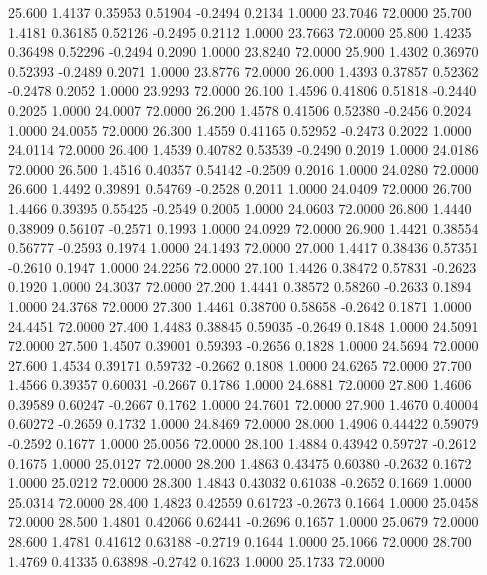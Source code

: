   25.600   1.4137   0.35953   0.51904  -0.2494   0.2134   1.0000  23.7046  72.0000
  25.700   1.4181   0.36185   0.52126  -0.2495   0.2112   1.0000  23.7663  72.0000
  25.800   1.4235   0.36498   0.52296  -0.2494   0.2090   1.0000  23.8240  72.0000
  25.900   1.4302   0.36970   0.52393  -0.2489   0.2071   1.0000  23.8776  72.0000
  26.000   1.4393   0.37857   0.52362  -0.2478   0.2052   1.0000  23.9293  72.0000
  26.100   1.4596   0.41806   0.51818  -0.2440   0.2025   1.0000  24.0007  72.0000
  26.200   1.4578   0.41506   0.52380  -0.2456   0.2024   1.0000  24.0055  72.0000
  26.300   1.4559   0.41165   0.52952  -0.2473   0.2022   1.0000  24.0114  72.0000
  26.400   1.4539   0.40782   0.53539  -0.2490   0.2019   1.0000  24.0186  72.0000
  26.500   1.4516   0.40357   0.54142  -0.2509   0.2016   1.0000  24.0280  72.0000
  26.600   1.4492   0.39891   0.54769  -0.2528   0.2011   1.0000  24.0409  72.0000
  26.700   1.4466   0.39395   0.55425  -0.2549   0.2005   1.0000  24.0603  72.0000
  26.800   1.4440   0.38909   0.56107  -0.2571   0.1993   1.0000  24.0929  72.0000
  26.900   1.4421   0.38554   0.56777  -0.2593   0.1974   1.0000  24.1493  72.0000
  27.000   1.4417   0.38436   0.57351  -0.2610   0.1947   1.0000  24.2256  72.0000
  27.100   1.4426   0.38472   0.57831  -0.2623   0.1920   1.0000  24.3037  72.0000
  27.200   1.4441   0.38572   0.58260  -0.2633   0.1894   1.0000  24.3768  72.0000
  27.300   1.4461   0.38700   0.58658  -0.2642   0.1871   1.0000  24.4451  72.0000
  27.400   1.4483   0.38845   0.59035  -0.2649   0.1848   1.0000  24.5091  72.0000
  27.500   1.4507   0.39001   0.59393  -0.2656   0.1828   1.0000  24.5694  72.0000
  27.600   1.4534   0.39171   0.59732  -0.2662   0.1808   1.0000  24.6265  72.0000
  27.700   1.4566   0.39357   0.60031  -0.2667   0.1786   1.0000  24.6881  72.0000
  27.800   1.4606   0.39589   0.60247  -0.2667   0.1762   1.0000  24.7601  72.0000
  27.900   1.4670   0.40004   0.60272  -0.2659   0.1732   1.0000  24.8469  72.0000
  28.000   1.4906   0.44422   0.59079  -0.2592   0.1677   1.0000  25.0056  72.0000
  28.100   1.4884   0.43942   0.59727  -0.2612   0.1675   1.0000  25.0127  72.0000
  28.200   1.4863   0.43475   0.60380  -0.2632   0.1672   1.0000  25.0212  72.0000
  28.300   1.4843   0.43032   0.61038  -0.2652   0.1669   1.0000  25.0314  72.0000
  28.400   1.4823   0.42559   0.61723  -0.2673   0.1664   1.0000  25.0458  72.0000
  28.500   1.4801   0.42066   0.62441  -0.2696   0.1657   1.0000  25.0679  72.0000
  28.600   1.4781   0.41612   0.63188  -0.2719   0.1644   1.0000  25.1066  72.0000
  28.700   1.4769   0.41335   0.63898  -0.2742   0.1623   1.0000  25.1733  72.0000
